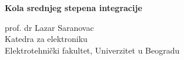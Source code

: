 \begin{frame}[label=03-s001]
\vspace{6mm}
{\fontsize{26}{30}\selectfont\bfseries Kola srednjeg stepena integracije\par}
\vspace{4mm}{\color{Accent}\rule{36mm}{1.2pt}}\par
\vspace{5mm}
prof. dr Lazar Saranovac\\
Katedra za elektroniku\\
Elektrotehnički fakultet, Univerzitet u Beogradu\par
\vspace{4mm}
\end{frame}
